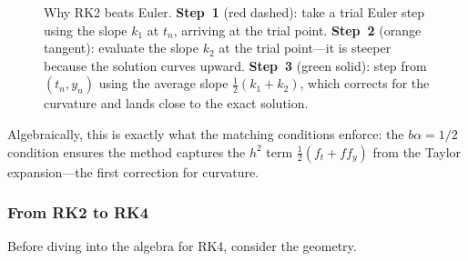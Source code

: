\documentclass[12pt,a4paper]{article}
\theoremstyle{definition}
\theoremstyle{plain}
\theoremstyle{remark}
\begin{document}
\begin{figure}[ht]
\caption{Why RK2 beats Euler. \textbf{Step~1} (red dashed): take a trial Euler step using the slope $k_1$ at $t_n$, arriving at the trial point. \textbf{Step~2} (orange tangent): evaluate the slope $k_2$ at the trial point---it is steeper because the solution curves upward. \textbf{Step~3} (green solid): step from $(t_n, y_n)$ using the average slope $\frac{1}{2}(k_1 + k_2)$, which corrects for the curvature and lands close to the exact solution.}
\label{fig:rk2_geometry}
\end{figure}

Algebraically, this is exactly what the matching conditions enforce: the $b\alpha = 1/2$ condition ensures the method captures the $h^2$ term $\frac{1}{2}(f_t + ff_y)$ from the Taylor expansion---the first correction for curvature.

\subsubsection{From RK2 to RK4}

Before diving into the algebra for RK4, consider the geometry.
\end{document}
